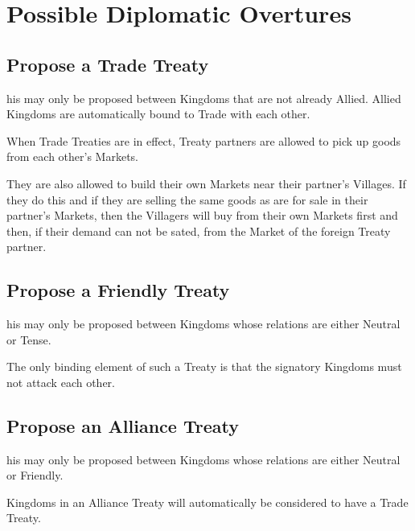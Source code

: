 \section{Possible Diplomatic Overtures}


\subsection{Propose a Trade Treaty}


his may only be proposed between Kingdoms that are not already Allied. Allied Kingdoms are automatically bound to Trade with each other.

When Trade Treaties are in effect, Treaty partners are allowed to pick up goods from each other’s Markets.

They are also allowed to build their own Markets near their partner’s Villages. If they do this and if they are selling the same goods as are for sale in their partner’s Markets, then the Villagers will buy from their own Markets first and then, if their demand can not be sated, from the Market of the foreign Treaty partner.

\subsection{Propose a Friendly Treaty}


his may only be proposed between Kingdoms whose relations are either Neutral or Tense.

The only binding element of such a Treaty is that the signatory Kingdoms must not attack each other.

\subsection{Propose an Alliance Treaty}


his may only be proposed between Kingdoms whose relations are either Neutral or Friendly.

Kingdoms in an Alliance Treaty will automatically be considered to have a Trade Treaty.

